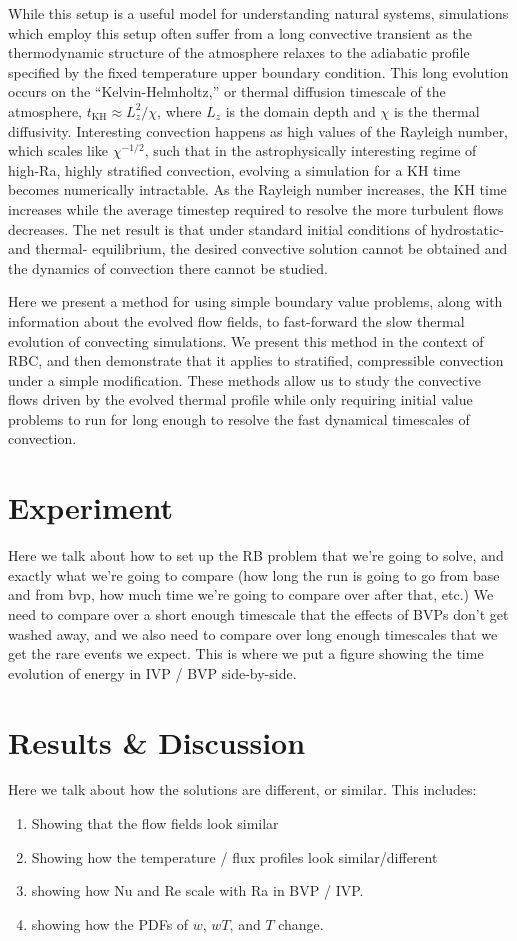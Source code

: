 \documentclass[aps, pre, onecolumn, nofootinbib, notitlepage, groupedaddress, amsfonts, amssymb, amsmath, longbibliography]{revtex4-1}
\begin{document}
While this setup is a useful model for understanding natural
systems, simulations which employ this setup often suffer from a long convective transient as the thermodynamic structure
of the atmosphere relaxes to the adiabatic profile specified by the fixed temperature upper boundary condition.
This long evolution occurs on the ``Kelvin-Helmholtz,'' or thermal diffusion timescale of the atmosphere, 
$t_{\text{KH}} \approx L_z^2 / \chi$, where $L_z$ is the domain depth and $\chi$ is the thermal diffusivity.
Interesting convection happens as high values of the Rayleigh number, which scales like $\chi^{-1/2}$, such that
in the astrophysically interesting regime of high-Ra, highly stratified convection, evolving a simulation for a
KH time becomes numerically intractable.  As the Rayleigh number increases, the KH time increases while the average
timestep required to resolve the more turbulent flows decreases.  The net result is that under standard initial conditions
of hydrostatic- and thermal- equilibrium, the desired convective solution cannot be obtained and the dynamics of convection
there cannot be studied.

Here we present a method for using simple boundary value problems, along with information about the evolved flow fields,
to fast-forward the slow thermal evolution of convecting simulations.  We present this method in the context of RBC, and
then demonstrate that it applies to stratified, compressible convection under a simple modification.  These methods allow
us to study the convective flows driven by the evolved thermal profile while only requiring initial value problems to run
for long enough to resolve the fast dynamical timescales of convection.


\section{Experiment} 
\label{sec:experiment}
Here we talk about how to set up the RB problem that we're going to solve, and exactly what
we're going to compare (how long the run is going to go from base and from bvp, how much time
we're going to compare over after that, etc.)  We need to compare over a short enough timescale
that the effects of BVPs don't get washed away, and we also need to compare over long enough
timescales that we get the rare events we expect.  This is where we put a figure showing the
time evolution of energy in IVP / BVP side-by-side.

\section{Results \& Discussion}
\label{sec:results}
Here we talk about how the solutions are different, or similar.  This includes:
\begin{enumerate}
\item Showing that the flow fields look similar
\item Showing how the temperature / flux profiles look similar/different
\item showing how Nu and Re scale with Ra in BVP / IVP.
\item showing how the PDFs of $w$, $wT$, and $T$ change.
\end{enumerate}
\end{document}
